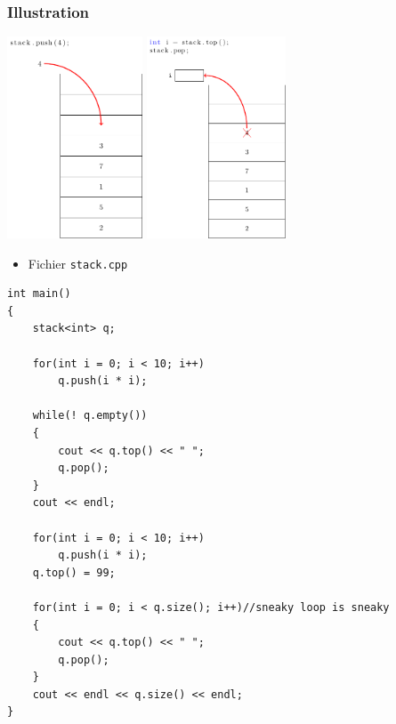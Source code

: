 \begin{frame}
\frametitle{Illustration}
\begin{center}
\includegraphics[height=6cm]{pics/stack-1.pdf}
\hspace{2cm}
\includegraphics[height=6cm]{pics/stack-2.pdf}
\end{center}
\end{frame}

\begin{frame}[containsverbatim]
\begin{itemize}
\item Fichier \texttt{stack.cpp}
\end{itemize}
\begin{lstlisting}
int main()
{	
	stack<int> q;

	for(int i = 0; i < 10; i++)
		q.push(i * i);

	while(! q.empty())
	{
		cout << q.top() << " ";
		q.pop();
	}
	cout << endl;
	
	for(int i = 0; i < 10; i++)
		q.push(i * i);
	q.top() = 99;
		
	for(int i = 0; i < q.size(); i++)//sneaky loop is sneaky
	{
		cout << q.top() << " ";
		q.pop();
	}
	cout << endl << q.size() << endl;
}
\end{lstlisting}
\end{frame}

